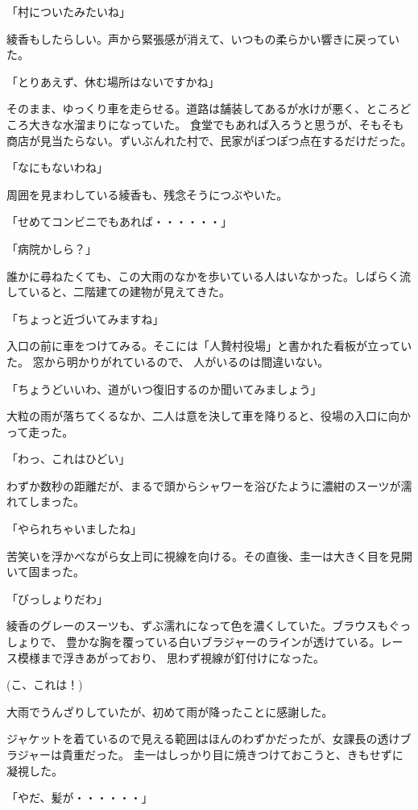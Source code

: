 ﻿\documentclass[book,tate]{jlreq}
\begin{document}
「村についたみたいね」

綾香もしたらしい。声から緊張感が消えて、いつもの柔らかい響きに戻っていた。

「とりあえず、休む場所はないですかね」

そのまま、ゆっくり車を走らせる。道路は舗装してあるが水けが悪く、ところどころ大きな水溜まりになっていた。
食堂でもあれば入ろうと思うが、そもそも商店が見当たらない。ずいぶんれた村で、民家がぽつぽつ点在するだけだった。

「なにもないわね」

周囲を見まわしている綾香も、残念そうにつぶやいた。

「せめてコンビニでもあれば・・・・・・」

「病院かしら？」

誰かに尋ねたくても、この大雨のなかを歩いている人はいなかった。しばらく流していると、二階建ての建物が見えてきた。

「ちょっと近づいてみますね」

入口の前に車をつけてみる。そこには「人贄村役場」と書かれた看板が立っていた。
窓から明かりがれているので、 人がいるのは間違いない。

「ちょうどいいわ、道がいつ復旧するのか聞いてみましょう」

大粒の雨が落ちてくるなか、二人は意を決して車を降りると、役場の入口に向かって走った。

「わっ、これはひどい」

わずか数秒の距離だが、まるで頭からシャワーを浴びたように濃紺のスーツが濡れてしまった。 

「やられちゃいましたね」

苦笑いを浮かべながら女上司に視線を向ける。その直後、圭一は大きく目を見開いて固まった。

「びっしょりだわ」

綾香のグレーのスーツも、ずぶ濡れになって色を濃くしていた。ブラウスもぐっしょりで、
豊かな胸を覆っている白いブラジャーのラインが透けている。レース模様まで浮きあがっており、
思わず視線が釘付けになった。

(こ、これは！)

大雨でうんざりしていたが、初めて雨が降ったことに感謝した。

ジャケットを着ているので見える範囲はほんのわずかだったが、女課長の透けブラジャーは貴重だった。
圭一はしっかり目に焼きつけておこうと、きもせずに凝視した。

「やだ、髪が・・・・・・」
\end{document}
